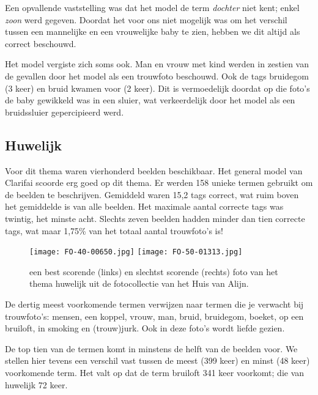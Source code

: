 Een opvallende vaststelling was dat het model de term \textit{dochter} niet kent; enkel \textit{zoon} werd gegeven. Doordat het voor ons niet mogelijk was om het verschil tussen een mannelijke en een vrouwelijke baby te zien, hebben we dit altijd als correct beschouwd.

Het model vergiste zich soms ook. Man en vrouw met kind werden in zestien van de gevallen door het model als een trouwfoto beschouwd. Ook de tags bruidegom (3 keer) en bruid kwamen voor (2 keer). Dit is vermoedelijk doordat op die foto’s de baby gewikkeld was in een sluier, wat verkeerdelijk door het model als een bruidssluier gepercipieerd werd.

\subsection{Huwelijk}
Voor dit thema waren vierhonderd beelden beschikbaar. Het general model van Clarifai scoorde erg goed op dit thema. Er werden 158 unieke termen gebruikt om de beelden te beschrijven. Gemiddeld waren 15,2 tags correct, wat ruim boven het gemiddelde is van alle beelden. Het maximale aantal correcte tags was twintig, het minste acht. Slechts zeven beelden hadden minder dan tien correcte tags, wat maar 1,75\% van het totaal aantal trouwfoto’s is!

\begin{figure}
	\centering
	\texttt{[image: FO-40-00650.jpg]}\hfill
	\texttt{[image: FO-50-01313.jpg]}\hfill
	\caption[Best en slechtst scorende foto van thema huwelijk]{een best scorende (links) en slechtst scorende (rechts) foto van het thema huwelijk uit de fotocollectie van het Huis van Alijn.}
\end{figure}

De dertig meest voorkomende termen verwijzen naar termen die je verwacht bij trouwfoto’s: mensen, een koppel, vrouw, man, bruid, bruidegom, boeket, op een bruiloft, in smoking en (trouw)jurk. Ook in deze foto’s wordt liefde gezien. 

De top tien van de termen komt in minstens de helft van de beelden voor. We stellen hier tevens een verschil vast tussen de meest (399 keer) en minst (48 keer) voorkomende term. Het valt op dat de term bruiloft 341 keer voorkomt; die van huwelijk 72 keer.

